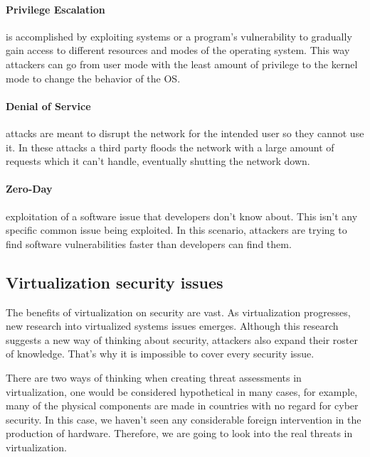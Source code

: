 \documentclass[10pt,oneside,english,a4paper]{article}
\begin{document}
\paragraph{Privilege Escalation}  is accomplished by exploiting systems or a program’s vulnerability to gradually gain access to different resources and modes of the operating system. This way attackers can go from user mode with the least amount of privilege to the kernel mode to change the behavior of the OS.

\paragraph{Denial of Service} attacks are meant to disrupt the network for the intended user so they cannot use it. In these attacks a third party floods the network with a large amount of requests which it can’t handle, eventually shutting the network down.


\paragraph{Zero-Day} exploitation of a software issue that developers don’t know about. This isn’t any specific common issue being exploited. In this scenario, attackers are trying to find software vulnerabilities faster than developers can find them.
 

\subsection{Virtualization security issues}
The benefits of virtualization on security are vast. As virtualization progresses, new research into virtualized systems issues emerges. Although this research suggests a new way of thinking about security, attackers also expand their roster of knowledge. That’s why it is impossible to cover every security issue.

There are two ways of thinking when creating threat assessments in virtualization, one would be considered hypothetical in many cases, for example, many of the physical components are made in countries with no regard for cyber security. In this case, we haven’t seen any considerable foreign intervention in the production of hardware. Therefore, we are going to look into the real threats in virtualization. \cite{11.zdroj}
\end{document}
